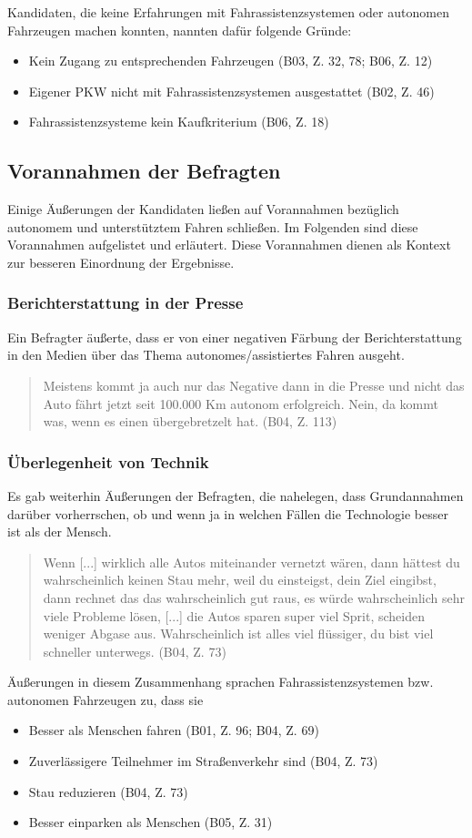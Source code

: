 \documentclass[12pt]{article}
\begin{document}
Kandidaten, die keine Erfahrungen mit Fahrassistenzsystemen oder autonomen Fahrzeugen machen konnten, nannten dafür folgende Gründe:
\begin{itemize}
    \item Kein Zugang zu entsprechenden Fahrzeugen (B03, Z. 32, 78; B06, Z. 12)
    \item Eigener PKW nicht mit Fahrassistenzsystemen ausgestattet (B02, Z. 46)
    \item Fahrassistenzsysteme kein Kaufkriterium (B06, Z. 18)
\end{itemize}

\subsection{Vorannahmen der Befragten}
Einige Äußerungen der Kandidaten ließen auf Vorannahmen bezüglich autonomem und unterstütztem Fahren schließen. Im Folgenden sind diese Vorannahmen aufgelistet und erläutert. Diese Vorannahmen dienen als Kontext zur besseren Einordnung der Ergebnisse.
\subsubsection*{Berichterstattung in der Presse}
Ein Befragter äußerte, dass er von einer negativen Färbung der Berichterstattung in den Medien über das Thema autonomes/assistiertes Fahren ausgeht.
\begin{quote}
    Meistens kommt ja auch nur das Negative dann in die Presse und nicht das Auto fährt jetzt seit 100.000 Km autonom erfolgreich. Nein, da kommt was, wenn es einen übergebretzelt hat. (B04, Z. 113)
\end{quote}

\subsubsection*{Überlegenheit von Technik}
Es gab weiterhin Äußerungen der Befragten, die nahelegen, dass Grundannahmen darüber vorherrschen, ob und wenn ja in welchen Fällen die Technologie besser ist als der Mensch.
\begin{quote}
    Wenn [...] wirklich alle Autos miteinander vernetzt wären, dann hättest du wahrscheinlich keinen Stau mehr, weil du einsteigst, dein Ziel eingibst, dann rechnet das das wahrscheinlich gut raus, es würde wahrscheinlich sehr viele Probleme lösen, [...] die Autos sparen super viel Sprit, scheiden weniger Abgase aus. Wahrscheinlich ist alles viel flüssiger, du bist viel schneller unterwegs. (B04, Z. 73)
\end{quote}
Äußerungen in diesem Zusammenhang sprachen Fahrassistenzsystemen bzw. autonomen Fahrzeugen zu, dass sie
\begin{itemize}
    \item Besser als Menschen fahren (B01, Z. 96; B04, Z. 69)
    \item Zuverlässigere Teilnehmer im Straßenverkehr sind (B04, Z. 73)
    \item Stau reduzieren (B04, Z. 73)
    \item Besser einparken als Menschen (B05, Z. 31)
\end{itemize}
\end{document}
